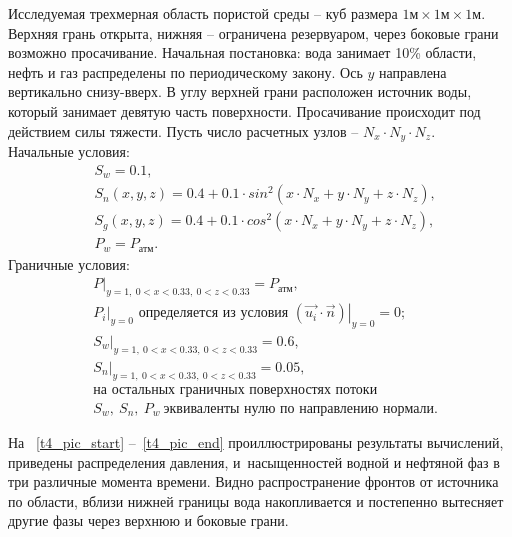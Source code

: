 Исследуемая трехмерная область пористой среды -- куб размера
$\text{1м} \times \text{1м} \times \text{1м}$.
Верхняя грань открыта, нижняя -- ограничена резервуаром, через боковые грани
возможно просачивание.
Начальная постановка: вода занимает 10\% области,
нефть и газ распределены по периодическому закону. Ось $y$ направлена вертикально снизу-вверх.
В углу верхней грани расположен источник воды, который занимает девятую часть поверхности. Просачивание происходит под действием силы тяжести. 
Пусть число расчетных узлов -- $N_x\cdot N_y\cdot N_z$.\\
Начальные условия:
\begin{equation}
  \begin{aligned}
    &S_w=0.1,\\
    &S_n(x, y, z)=0.4 + 0.1 \cdot sin^2(x \cdot N_x + y \cdot N_y + z \cdot N_z),\\
    &S_g(x, y, z)=0.4 + 0.1 \cdot cos^2(x \cdot N_x + y \cdot N_y + z \cdot N_z),\\
    &P_w=P_\text{атм}.
   \end{aligned}
\end{equation}
Граничные условия:
\begin{equation}
  \begin{aligned}
    &\left.P\right|_{y=1,\ 0 < x < 0.33,\ 0 < z < 0.33}=P_{\text{атм}},\\
    &\left.{P_i}\right|_{y=0}\text{ определяется из условия } \left.(\overrightarrow{u_i} \cdot \overrightarrow{n})\right|_{y=0}=0;\\
    &\left.S_w\right|_{y=1,\ 0 < x < 0.33,\ 0 < z < 0.33}=0.6,\\
    &\left.S_n\right|_{y=1,\ 0 < x < 0.33,\ 0 < z < 0.33}=0.05,\\
    &\text{на остальных граничных поверхностях потоки}\\
    &S_w,\ S_n,\ P_w\ \text{эквиваленты нулю по направлению нормали.}
  \end{aligned}
\end{equation}

На ~\ref{t4_pic_start} --~\ref{t4_pic_end} проиллюстрированы результаты вычислений, приведены распределения давления,
и~насыщенностей водной и нефтяной фаз в три различные момента времени. Видно распространение фронтов от источника по области, вблизи нижней границы вода накопливается и постепенно вытесняет другие фазы через верхнюю и боковые грани.

